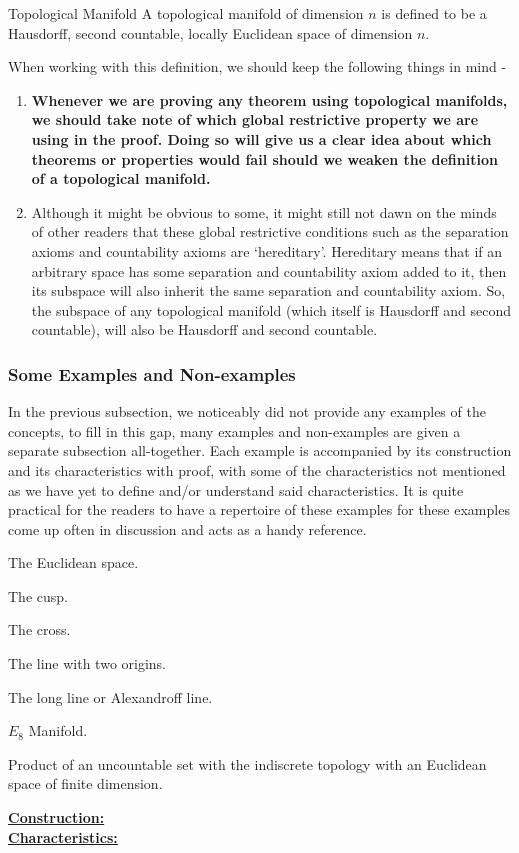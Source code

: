 \begin{Definition}{Topological Manifold}\label{topological_manifold}
	A topological manifold of dimension $n$ is defined to be a Hausdorff, second countable, locally Euclidean space of dimension $n$.
\end{Definition}
\noindent When working with this definition, we should keep the following things in mind -
\begin{enumerate}
	\item \textbf{Whenever we are proving any theorem using topological manifolds, we should take note of which global restrictive property we are using in the proof. Doing so will give us a clear idea about which theorems or properties would fail should we weaken the definition of a topological manifold.}
	\item Although it might be obvious to some, it might still not dawn on the minds of other readers that these global restrictive conditions such as the separation axioms and countability axioms are `hereditary'. Hereditary means that if an arbitrary space has some separation and countability axiom added to it, then its subspace will also inherit the same separation and countability axiom. So, the subspace of any topological manifold (which itself is Hausdorff and second countable), will also be Hausdorff and second countable.
\end{enumerate}
\subsubsection{Some Examples and Non-examples}
In the previous subsection, we noticeably did not provide any examples of the concepts, to fill in this gap, many examples and non-examples are given a separate subsection all-together. Each example is accompanied by its construction and its characteristics with proof, with some of the characteristics not mentioned as we have yet to define and/or understand said characteristics. It is quite practical for the readers to have a repertoire of these examples for these examples come up often in discussion and acts as a handy reference.
\begin{Example}
	The Euclidean space.
\end{Example}
\begin{Example}
	The cusp.
\end{Example}
\begin{Example}
	The cross.
\end{Example}
\begin{Example}
	The line with two origins.
\end{Example}
\begin{Example}\label{the_long_line}
	The long line or Alexandroff line.
\end{Example}
\begin{Example}
	$E_8$ Manifold.
\end{Example}
\begin{Example}
	Product of an uncountable set with the indiscrete topology with an Euclidean space of finite dimension.
\end{Example}
\noindent \textbf{\underline{Construction:}} \\
\textbf{\underline{Characteristics:}}
